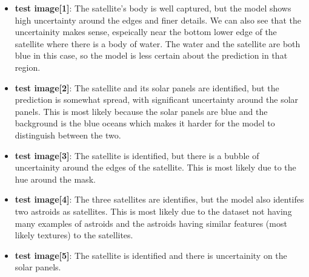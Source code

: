 \documentclass{article}
\begin{document}
\begin{itemize}
    \item \textbf{test image[1]}: The satellite's body is well captured, but the model shows high uncertainty around the 
    edges and finer details. We can also see that the uncertainity makes sense, espeically near the bottom lower edge of 
    the satellite where there is a body of water. The water and the satellite are both blue in this case, so the model is 
    less certain about the prediction in that region.
    \item \textbf{test image[2]}: The satellite and its solar panels are identified, but the prediction is somewhat 
    spread, with significant uncertainty around the solar panels. This is most likely because the solar panels are blue 
    and the background is the blue oceans which makes it harder for the model to distinguish between the two.
    \item \textbf{test image[3]}: The satellite is identified, but there is a bubble of 
    uncertainity around the edges of the satellite. This is most likely due to the hue around the mask.
    \item \textbf{test image[4]}: The three satellites are identifies, but the model also identifes two astroids as satellites. 
    This is most likely due to the dataset not having many examples of astroids and the astroids having similar features 
    (most likely textures) to the satellites.
    \item \textbf{test image[5]}: The satellite is identified and there is uncertainity on the solar panels.
\end{itemize}
\vspace{1em}
\end{document}
